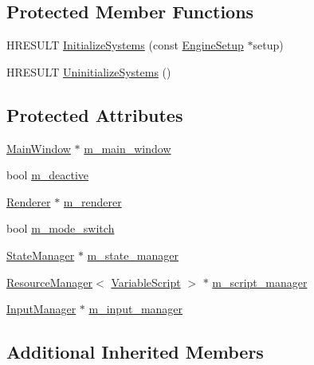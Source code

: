 \subsection*{Protected Member Functions}
\begin{DoxyCompactItemize}
\item 
H\+R\+E\+S\+U\+LT \hyperlink{classmage_1_1_engine_ac43f1de00841a6fe51c9e4567ac47bd1}{Initialize\+Systems} (const \hyperlink{structmage_1_1_engine_setup}{Engine\+Setup} $\ast$setup)
\item 
H\+R\+E\+S\+U\+LT \hyperlink{classmage_1_1_engine_ad760164f873e1d15aa8826d532b6d551}{Uninitialize\+Systems} ()
\end{DoxyCompactItemize}
\subsection*{Protected Attributes}
\begin{DoxyCompactItemize}
\item 
\hyperlink{classmage_1_1_main_window}{Main\+Window} $\ast$ \hyperlink{classmage_1_1_engine_abe33f2ef533f142a0e9ba8d3a2a51d6b}{m\+\_\+main\+\_\+window}
\item 
bool \hyperlink{classmage_1_1_engine_ab8a4b0157403708ae7d1d018a95b4c63}{m\+\_\+deactive}
\item 
\hyperlink{classmage_1_1_renderer}{Renderer} $\ast$ \hyperlink{classmage_1_1_engine_ad2107f910b4471ee3d3934588c6d36c3}{m\+\_\+renderer}
\item 
bool \hyperlink{classmage_1_1_engine_aa5cb2e0b7bb2c4a9020e79ab832ee221}{m\+\_\+mode\+\_\+switch}
\item 
\hyperlink{classmage_1_1_state_manager}{State\+Manager} $\ast$ \hyperlink{classmage_1_1_engine_a7a0c463c67c3375b896809be9046113d}{m\+\_\+state\+\_\+manager}
\item 
\hyperlink{classmage_1_1_resource_manager}{Resource\+Manager}$<$ \hyperlink{classmage_1_1_variable_script}{Variable\+Script} $>$ $\ast$ \hyperlink{classmage_1_1_engine_a4faf1b8f94a84be27dd63054bf6fe36d}{m\+\_\+script\+\_\+manager}
\item 
\hyperlink{classmage_1_1_input_manager}{Input\+Manager} $\ast$ \hyperlink{classmage_1_1_engine_a17aec067a1337c567c5cb1959c668da6}{m\+\_\+input\+\_\+manager}
\end{DoxyCompactItemize}
\subsection*{Additional Inherited Members}


